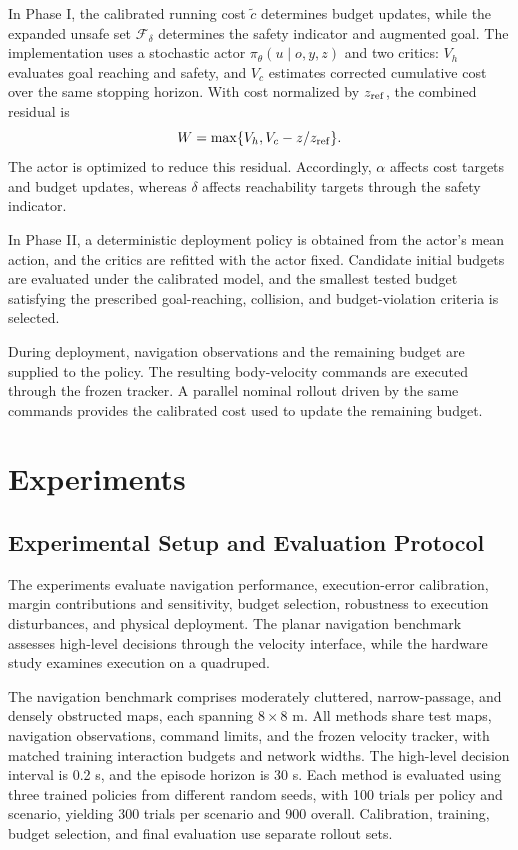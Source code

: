 \documentclass[conference]{IEEEtran}
\begin{document}
In Phase I, the calibrated running cost $\tilde c$ determines budget updates, while
the expanded unsafe set $\mathcal{F}_\delta$ determines the safety indicator and
augmented goal. The implementation uses a stochastic actor
$\pi_\theta(u\mid o,y,z)$ and two critics: $V_h$ evaluates goal reaching and safety,
and $V_c$ estimates corrected cumulative cost over the same stopping horizon. With
cost normalized by $z_{\rm ref}$, the combined residual is
\[
W=\max\{V_h,V_c-z/z_{\rm ref}\}.
\]
The actor is optimized to reduce this residual. Accordingly, $\alpha$ affects cost
targets and budget updates, whereas $\delta$ affects reachability targets through
the safety indicator.

In Phase II, a deterministic deployment policy is obtained from the actor's mean
action, and the critics are refitted with the actor fixed. Candidate initial
budgets are evaluated under the calibrated model, and the smallest tested budget
satisfying the prescribed goal-reaching, collision, and budget-violation criteria
is selected.

During deployment, navigation observations and the remaining budget are supplied
to the policy. The resulting body-velocity commands are executed through the
frozen tracker. A parallel nominal rollout driven by the same commands provides
the calibrated cost used to update the remaining budget.

\section{Experiments}
\subsection{Experimental Setup and Evaluation Protocol}
\label{sec:experimental_setup}
The experiments evaluate navigation performance, execution-error calibration,
margin contributions and sensitivity, budget selection, robustness to execution
disturbances, and physical deployment. The planar navigation benchmark assesses high-level
decisions through the velocity interface, while the hardware study examines
execution on a quadruped.

The navigation benchmark comprises moderately cluttered, narrow-passage, and
densely obstructed maps, each spanning $8\times8$ m. All methods share test maps,
navigation observations, command limits, and the frozen velocity tracker, with
matched training interaction budgets and network widths. The high-level decision
interval is 0.2 s, and the episode horizon is 30 s. Each method is evaluated using
three trained policies from different random seeds, with 100 trials per policy
and scenario, yielding 300 trials per scenario and 900 overall. Calibration,
training, budget selection, and final evaluation use separate rollout sets.
\end{document}
